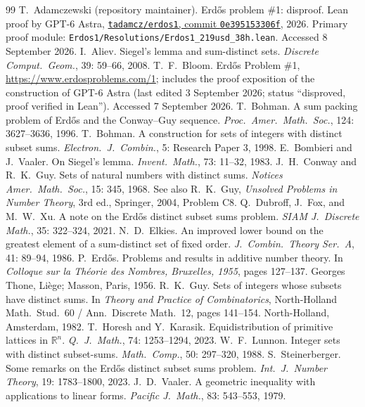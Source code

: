 \documentclass[12pt]{article}
\newcommand{\R}{\mathbb{R}}
\begin{document}
\begin{thebibliography}{99}
 T.~Adamczewski (repository maintainer). Erd\H{o}s problem \#1: disproof. Lean proof by GPT-6 Astra,
\href{https://github.com/tadamcz/erdos1/tree/0e395153306f34b3829d118b85bdd704136f2843}{\texttt{tadamcz/erdos1}, commit \texttt{0e395153306f}}, 2026.
Primary proof module: \texttt{Erdos1/Resolutions/Erdos1\_219usd\_38h.lean}. Accessed 8 September 2026.
 I.~Aliev. Siegel's lemma and sum-distinct sets. \emph{Discrete Comput.\ Geom.}, 39: 59--66, 2008. 
 T.~F.~Bloom. Erd\H{o}s Problem \#1, \url{https://www.erdosproblems.com/1}; includes the proof exposition of the construction of GPT-6 Astra (last edited 3 September 2026; status ``disproved, proof verified in Lean''). Accessed 7 September 2026.
 T.~Bohman. A sum packing problem of Erd\H{o}s and the Conway--Guy sequence. \emph{Proc.\ Amer.\ Math.\ Soc.}, 124: 3627--3636, 1996. 
 T.~Bohman. A construction for sets of integers with distinct subset sums. \emph{Electron.\ J.\ Combin.}, 5: Research Paper 3, 1998. 
 E.~Bombieri and J.~Vaaler. On Siegel's lemma. \emph{Invent.\ Math.}, 73: 11--32, 1983. 
 J.~H.~Conway and R.~K.~Guy. Sets of natural numbers with distinct sums. \emph{Notices Amer.\ Math.\ Soc.}, 15: 345, 1968. See also R.~K.~Guy, \emph{Unsolved Problems in Number Theory}, 3rd ed., Springer, 2004, Problem C8.
 Q.~Dubroff, J.~Fox, and M.~W.~Xu. A note on the Erd\H{o}s distinct subset sums problem. \emph{SIAM J.\ Discrete Math.}, 35: 322--324, 2021. 
 N.~D.~Elkies. An improved lower bound on the greatest element of a sum-distinct set of fixed order. \emph{J.\ Combin.\ Theory Ser.\ A}, 41: 89--94, 1986.\newline{}
 P.~Erd\H{o}s. Problems and results in additive number theory. In \emph{Colloque sur la Th\'eorie des Nombres, Bruxelles, 1955}, pages 127--137. Georges Thone, Li\`ege; Masson, Paris, 1956.
 R.~K.~Guy. Sets of integers whose subsets have distinct sums. In \emph{Theory and Practice of Combinatorics}, North-Holland Math.\ Stud.\ 60 / Ann.\ Discrete Math.\ 12, pages 141--154. North-Holland, Amsterdam, 1982. 
 T.~Horesh and Y.~Karasik. Equidistribution of primitive lattices in $\R^n$. \emph{Q.\ J.\ Math.}, 74: 1253--1294, 2023. 
 W.~F.~Lunnon. Integer sets with distinct subset-sums. \emph{Math.\ Comp.}, 50: 297--320, 1988. 
 S.~Steinerberger. Some remarks on the Erd\H{o}s distinct subset sums problem. \emph{Int.\ J.\ Number Theory}, 19: 1783--1800, 2023. 
 J.~D.~Vaaler. A geometric inequality with applications to linear forms. \emph{Pacific J.\ Math.}, 83: 543--553, 1979. 
\end{thebibliography}
\end{document}
